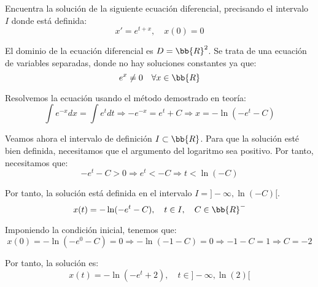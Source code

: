 \documentclass[12pt]{article}
\begin{document}
    \begin{ejercicio}
        Encuentra la solución de la siguiente ecuación diferencial, precisando el intervalo $I$ donde está definida:
        \begin{equation*}
            x' = e^{t+x}, \quad x(0) = 0
        \end{equation*}

        El dominio de la ecuación diferencial es $D=\bb{R}^2$.
        Se trata de una ecuación de variables separadas, donde no hay soluciones constantes ya que:
        \begin{equation*}
            e^x\neq 0 \quad \forall x\in \bb{R}
        \end{equation*}

        Resolvemos la ecuación usando el método demostrado en teoría:
        \begin{equation*}
            \int e^{-x}dx = \int e^t dt \Longrightarrow -e^{-x} = e^t + C
            \Longrightarrow x = -\ln(-e^t - C)
        \end{equation*}

        Veamos ahora el intervalo de definición $I\subset \bb{R}$. Para que la solución esté bien definida, necesitamos que el argumento del logaritmo sea positivo. Por tanto, necesitamos que:
        \begin{equation*}
            -e^t - C > 0 \Longrightarrow e^t < -C \Longrightarrow t < \ln(-C)
        \end{equation*}

        Por tanto, la solución está definida en el intervalo $I=]-\infty, \ln(-C)[$.
        \begin{equation*}
            x(t) = -\ln(-e^t - C), \quad t\in I, \quad C\in \bb{R}^-
        \end{equation*}

        Imponiendo la condición inicial, tenemos que:
        \begin{equation*}
            x(0) = -\ln(-e^0 - C) = 0 \Longrightarrow -\ln(-1 - C) = 0 \Longrightarrow -1-C=1 \Longrightarrow C=-2
        \end{equation*}

        Por tanto, la solución es:
        \begin{equation*}
            x(t) = -\ln(-e^t + 2), \quad t\in ]-\infty, \ln(2)[
        \end{equation*}
    \end{ejercicio}
\end{document}
